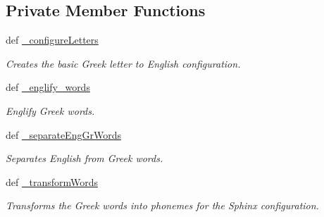 \subsection*{Private Member Functions}
\begin{DoxyCompactItemize}
\item 
def \hyperlink{classrapp__speech__detection__sphinx4_1_1greek__support_1_1GreekSupport_ac5823a37a949ba4bf9669906913e064b}{\-\_\-configure\-Letters}
\begin{DoxyCompactList}\small\item\em Creates the basic Greek letter to English configuration. \end{DoxyCompactList}\item 
def \hyperlink{classrapp__speech__detection__sphinx4_1_1greek__support_1_1GreekSupport_a26445e371062313c7e1a7a04562a3bf7}{\-\_\-englify\-\_\-words}
\begin{DoxyCompactList}\small\item\em Englify Greek words. \end{DoxyCompactList}\item 
def \hyperlink{classrapp__speech__detection__sphinx4_1_1greek__support_1_1GreekSupport_ac38f1a62d970abe4a373bda19160ccd9}{\-\_\-separate\-Eng\-Gr\-Words}
\begin{DoxyCompactList}\small\item\em Separates English from Greek words. \end{DoxyCompactList}\item 
def \hyperlink{classrapp__speech__detection__sphinx4_1_1greek__support_1_1GreekSupport_ac7e3b9ebc81d7c52b0892edf79ae5edc}{\-\_\-transform\-Words}
\begin{DoxyCompactList}\small\item\em Transforms the Greek words into phonemes for the Sphinx configuration. \end{DoxyCompactList}\end{DoxyCompactItemize}
